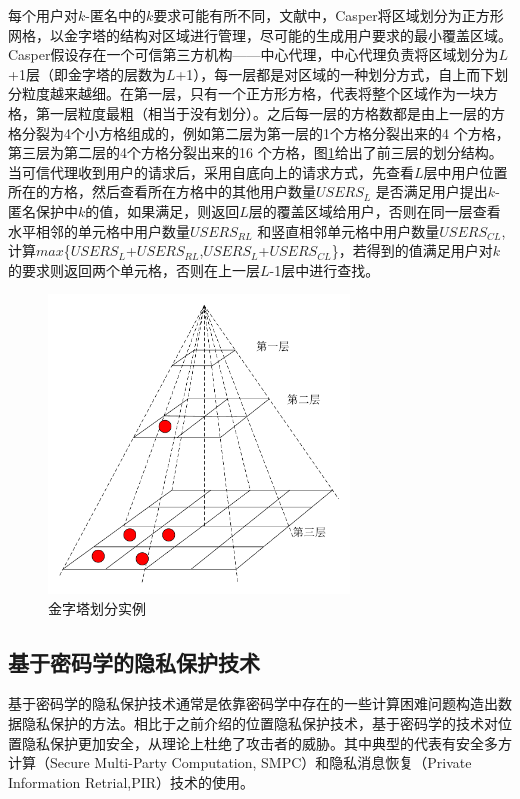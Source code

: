 每个用户对$k$-匿名中的$k$要求可能有所不同，文献\cite{Mokbel}中，Casper将区域划分为正方形网格，以金字塔的结构对区域进行管理，尽可能的生成用户要求的最小覆盖区域。Casper假设存在一个可信第三方机构——中心代理，中心代理负责将区域划分为$L$+1层（即金字塔的层数为$L$+1），每一层都是对区域的一种划分方式，自上而下划分粒度越来越细。在第一层，只有一个正方形方格，代表将整个区域作为一块方格，第一层粒度最粗（相当于没有划分）。之后每一层的方格数都是由上一层的方格分裂为4个小方格组成的，例如第二层为第一层的1个方格分裂出来的4 个方格，第三层为第二层的4个方格分裂出来的16 个方格，图\ref{fig:GoldTower_pdf}给出了前三层的划分结构。当可信代理收到用户的请求后，采用自底向上的请求方式，先查看$L$层中用户位置所在的方格，然后查看所在方格中的其他用户数量$USERS_L$ 是否满足用户提出$k$- 匿名保护中$k$的值，如果满足，则返回$L$层的覆盖区域给用户，否则在同一层查看水平相邻的单元格中用户数量$USERS_{RL}$ 和竖直相邻单元格中用户数量$USERS_{CL}$, 计算$max$\{$USERS_L$+$USERS_{RL}$,$USERS_L$+$USERS_{CL}$\}，若得到的值满足用户对$k$的要求则返回两个单元格，否则在上一层$L$-1层中进行查找。
\begin{figure}[H]
\centering
\includegraphics[width=8cm]{fig/GoldTower.pdf}
\caption{金字塔划分实例} %
\label{fig:GoldTower_pdf}
\end{figure}
\subsection{基于密码学的隐私保护技术}
基于密码学的隐私保护技术通常是依靠密码学中存在的一些计算困难问题构造出数据隐私保护的方法。相比于之前介绍的位置隐私保护技术，基于密码学的技术对位置隐私保护更加安全，从理论上杜绝了攻击者的威胁。其中典型的代表有安全多方计算（Secure Multi-Party Computation, SMPC）和隐私消息恢复（Private Information Retrial,PIR）技术的使用。

